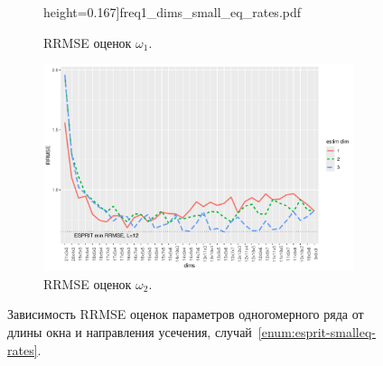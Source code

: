 \documentclass[specialist,
  substylefile=spbu_report.rtx,
subf,href,colorlinks=true, 12pt]{disser}
\theoremstyle{plain}
\theoremstyle{definition}
\theoremstyle{remark}
\begin{document}
\begin{figure}[!ht]
\begin{subfigure}{0.49\linewidth}
    height=0.167\textheight]{freq1_dims_small_eq_rates.pdf}
    \caption{RRMSE оценок $\omega_1$.}
    \label{fig:freq1_dims_small_eq_rates}
  \end{subfigure}
  \begin{subfigure}{0.49\linewidth}
    \includegraphics[width=\linewidth,
    height=0.167\textheight]{freq2_dims_small_eq_rates.pdf}
    \caption{RRMSE оценок $\omega_2$.}
    \label{fig:freq2_dims_small_eq_rates}
  \end{subfigure}
  \caption{Зависимость RRMSE оценок параметров одногомерного ряда
    от длины окна и направления усечения,
  случай~\ref{enum:esprit-smalleq-rates}.}
  \label{fig:dims_small_eq_rates}
\end{figure}
\end{document}
